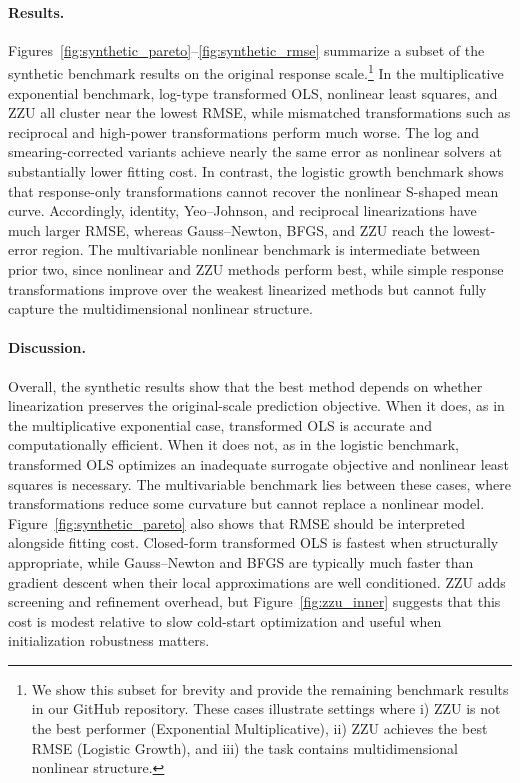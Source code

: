 \documentclass[11pt]{article}
\begin{document}
\paragraph{Results.}
Figures~\ref{fig:synthetic_pareto}--\ref{fig:synthetic_rmse} summarize a subset of the synthetic benchmark results on the original response scale.\footnote{We show this subset for brevity and provide the remaining benchmark results in our GitHub repository. These cases illustrate settings where i) ZZU is not the best performer (Exponential Multiplicative), ii) ZZU achieves the best RMSE (Logistic Growth), and iii) the task contains multidimensional nonlinear structure.} In the multiplicative exponential benchmark, log-type transformed OLS, nonlinear least squares, and ZZU all cluster near the lowest RMSE, while mismatched transformations such as reciprocal and high-power transformations perform much worse. The log and smearing-corrected variants achieve nearly the same error as nonlinear solvers at substantially lower fitting cost. In contrast, the logistic growth benchmark shows that response-only transformations cannot recover the nonlinear S-shaped mean curve. Accordingly, identity, Yeo--Johnson, and reciprocal linearizations have much larger RMSE, whereas Gauss--Newton, BFGS, and ZZU reach the lowest-error region. The multivariable nonlinear benchmark is intermediate between prior two, since nonlinear and ZZU methods perform best, while simple response transformations improve over the weakest linearized methods but cannot fully capture the multidimensional nonlinear structure.

\paragraph{Discussion.}
Overall, the synthetic results show that the best method depends on whether linearization preserves the original-scale prediction objective. When it does, as in the multiplicative exponential case, transformed OLS is accurate and computationally efficient. When it does not, as in the logistic benchmark, transformed OLS optimizes an inadequate surrogate objective and nonlinear least squares is necessary. The multivariable benchmark lies between these cases, where transformations reduce some curvature but cannot replace a nonlinear model. Figure~\ref{fig:synthetic_pareto} also shows that RMSE should be interpreted alongside fitting cost. Closed-form transformed OLS is fastest when structurally appropriate, while Gauss--Newton and BFGS are typically much faster than gradient descent when their local approximations are well conditioned. ZZU adds screening and refinement overhead, but Figure~\ref{fig:zzu_inner} suggests that this cost is modest relative to slow cold-start optimization and useful when initialization robustness matters.
\end{document}

